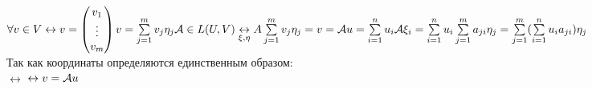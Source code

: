 \documentclass[../spring.tex]{subfiles}
\begin{document}
	$\forall v\in V \leftrightarrow v = \begin{pmatrix}
	v_1\\
	\vdots\\
	v_m
	\end{pmatrix}\\	
	v = \sum\limits_{j=1}^{m}v_j\eta_j\\
	\mathcal{A}\in L(U, V) \underset{\xi, \eta}{\leftrightarrow} A\\
	\sum\limits_{j=1}^m v_j\eta_j = v = \mathcal{A} u = \sum\limits_{i=1}^n u_i\mathcal{A}\xi_i = \sum\limits_{i=1}^n u_i
	\sum\limits_{j=1}^m a_{ji}\eta_j = \sum\limits_{j=1}^m (\sum\limits_{i=1}^n u_i a_{ji})\eta_j$\\
	Так как координаты определяются единственным образом:\\
	$\leftrightarrow$ 
	 $\leftrightarrow v = \mathcal{A} u$
	
\end{document}
